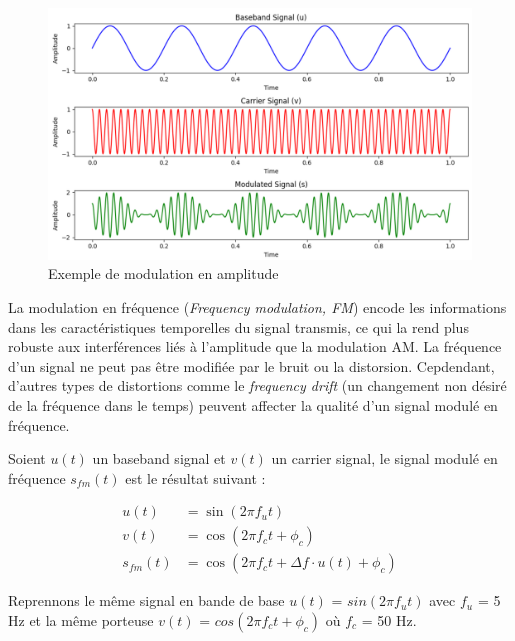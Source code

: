 \begin{figure}[h]
\centering

\includegraphics[scale=0.5]{images/AM_mod.PNG}
\caption{Exemple de modulation en amplitude}\label{term1}
\end{figure}


La modulation en fréquence (\textit{Frequency modulation, FM}) encode les informations dans les caractéristiques temporelles du signal transmis, ce qui la rend plus robuste aux interférences liés à l'amplitude que la modulation AM. La fréquence d'un signal ne peut pas être modifiée par le bruit ou la distorsion. Cepdendant, d'autres types de distortions comme le \textit{frequency drift} (un changement non désiré de la fréquence dans le temps) peuvent affecter la qualité d'un signal modulé en fréquence.

\vspace{0.1cm}

Soient $u(t)$ un baseband signal et $v(t)$ un carrier signal, le signal modulé en fréquence $s_{fm}(t)$ est le résultat suivant :

\begin{align}
    u(t) &= \sin(2\pi f_{u}t) \\
    v(t) &= \cos(2\pi f_{c}t + \phi_{c}) \\
    s_{fm}(t) &= \cos\left(2\pi f_{c}t + \Delta f \cdot u(t) + \phi_{c}\right)
\end{align}

\vspace{0.1cm}

Reprennons le même signal en bande de base 
$u(t)$ = $sin(2\pi f_{u}t)$ avec $f_{u}$ = 5 Hz et la même porteuse 
$v(t)$ = $cos(2\pi f_{c}t + \phi_{c})$ où $f_{c}$ = 50 Hz.

\vspace{0.1cm}

